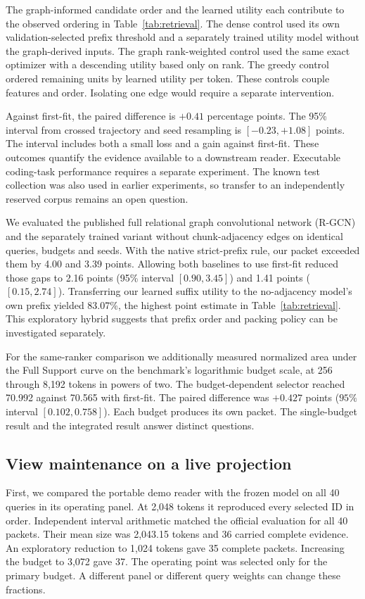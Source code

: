 \documentclass[conference]{IEEEtran}
\begin{document}
The graph-informed candidate order and the learned utility each contribute to the observed ordering in Table~\ref{tab:retrieval}. The dense control used its own validation-selected prefix threshold and a separately trained utility model without the graph-derived inputs. The graph rank-weighted control used the same exact optimizer with a descending utility based only on rank. The greedy control ordered remaining units by learned utility per token. These controls couple features and order. Isolating one edge would require a separate intervention.

Against first-fit, the paired difference is $+0.41$ percentage points. The 95\% interval from crossed trajectory and seed resampling is $[-0.23,+1.08]$ points. The interval includes both a small loss and a gain against first-fit. These outcomes quantify the evidence available to a downstream reader. Executable coding-task performance requires a separate experiment. The known test collection was also used in earlier experiments, so transfer to an independently reserved corpus remains an open question.

We evaluated the published full relational graph convolutional network (R-GCN) and the separately trained variant without chunk-adjacency edges on identical queries, budgets and seeds. With the native strict-prefix rule, our packet exceeded them by 4.00 and 3.39 points. Allowing both baselines to use first-fit reduced those gaps to 2.16 points (95\% interval $[0.90,3.45]$) and 1.41 points ($[0.15,2.74]$). Transferring our learned suffix utility to the no-adjacency model's own prefix yielded 83.07\%, the highest point estimate in Table~\ref{tab:retrieval}. This exploratory hybrid suggests that prefix order and packing policy can be investigated separately.

For the same-ranker comparison we additionally measured normalized area under the Full Support curve on the benchmark's logarithmic budget scale, at 256 through 8,192 tokens in powers of two. The budget-dependent selector reached 70.992 against 70.565 with first-fit. The paired difference was $+0.427$ points ($95\%$ interval $[0.102,0.758]$). Each budget produces its own packet. The single-budget result and the integrated result answer distinct questions.

\subsection{View maintenance on a live projection}
First, we compared the portable demo reader with the frozen model on all 40 queries in its operating panel. At 2,048 tokens it reproduced every selected ID in order. Independent interval arithmetic matched the official evaluation for all 40 packets. Their mean size was 2,043.15 tokens and 36 carried complete evidence. An exploratory reduction to 1,024 tokens gave 35 complete packets. Increasing the budget to 3,072 gave 37. The operating point was selected only for the primary budget. A different panel or different query weights can change these fractions.
\end{document}
